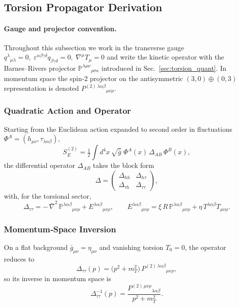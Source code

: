 \documentclass{article}
\begin{document}








\subsection{Torsion Propagator Derivation}
\label{subsec:torsion_propagator}

\paragraph{Gauge and projector convention.}
Throughout this subsection we work in the transverse gauge
$q^{\lambda}{}_{\mu\lambda}=0,\;
 \varepsilon^{\alpha\beta\gamma\delta}q_{\beta\gamma\delta}=0,\;
 \nabla^{\mu}T_\mu=0$
and write the kinetic operator with the Barnes–Rivers projector
$\mathbb{P}^{\lambda\mu\nu}{}_{\rho\sigma\kappa}$ introduced in
Sec.~\ref{sec:torsion_quant}.  In momentum space the spin‑2 projector on the
antisymmetric \((3,0)\oplus(0,3)\) representation is denoted
$P^{(2)\,\lambda\alpha\beta}{}_{\mu\nu\rho}$.

\subsubsection{Quadratic Action and Operator}
Starting from the Euclidean action expanded to second order in fluctuations
\(\Phi^A=(h_{\mu\nu},\tau_{\lambda\alpha\beta})\),
\[
  S_E^{(2)}
  = \tfrac12\int d^4x\,\sqrt{\bar g}\;
    \Phi^A(x)\,\Delta_{AB}\,\Phi^B(x),
\]
the differential operator \(\Delta_{AB}\) takes the block form
\[
  \Delta = 
  \begin{pmatrix}
    \Delta_{hh} & \Delta_{h\tau}\\
    \Delta_{\tau h} & \Delta_{\tau\tau}
  \end{pmatrix},
\]
with, for the torsional sector,
\[
  \Delta_{\tau\tau}
  = -\,\bar\nabla^2\,\mathbb{P}^{\lambda\alpha\beta}{}_{\mu\nu\rho}
    + E^{\lambda\alpha\beta}{}_{\mu\nu\rho},\qquad
  E^{\lambda\alpha\beta}{}_{\mu\nu\rho}
  = \xi\,R\,\mathbb{P}^{\lambda\alpha\beta}{}_{\mu\nu\rho}
    + \eta\,T^{\lambda\alpha\beta}T_{\mu\nu\rho}.
\]

\subsubsection{Momentum‐Space Inversion}
On a flat background \(\bar g_{\mu\nu}=\eta_{\mu\nu}\) and vanishing torsion
\(T_0=0\), the operator reduces to
\[
  \Delta_{\tau\tau}(p)
  = \bigl(p^2 + m_T^2\bigr)\,
    P^{(2)\,\lambda\alpha\beta}{}_{\mu\nu\rho},
\]
so its inverse in momentum space is
\[
  \Delta^{-1}_{\tau\tau}(p)
  = \frac{P^{(2)\,\mu\nu\rho}{}_{\lambda\alpha\beta}}{p^2 + m_T^2}.
\]
\end{document}
